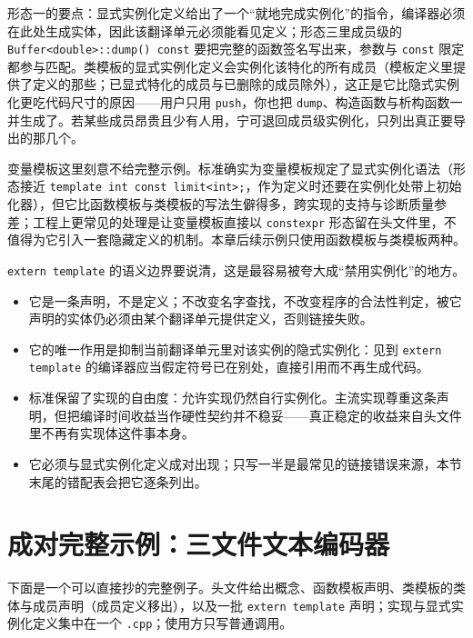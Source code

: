 \documentclass[12pt,a4paper,fontset=fandol]{ctexbook}
\newcommand{\kw}[1]{\texttt{#1}}
\begin{document}
形态一的要点：显式实例化定义给出了一个“就地完成实例化”的指令，编译器必须在此处生成实体，因此该翻译单元必须能看见定义；形态三里成员级的 \kw{Buffer<double>::dump() const} 要把完整的函数签名写出来，参数与 \kw{const} 限定都参与匹配。类模板的显式实例化定义会实例化该特化的所有成员（模板定义里提供了定义的那些；已显式特化的成员与已删除的成员除外），这正是它比隐式实例化更吃代码尺寸的原因——用户只用 \kw{push}，你也把 \kw{dump}、构造函数与析构函数一并生成了。若某些成员昂贵且少有人用，宁可退回成员级实例化，只列出真正要导出的那几个。

变量模板这里刻意不给完整示例。标准确实为变量模板规定了显式实例化语法（形态接近 \kw{template int const limit<int>;}，作为定义时还要在实例化处带上初始化器），但它比函数模板与类模板的写法生僻得多，跨实现的支持与诊断质量参差；工程上更常见的处理是让变量模板直接以 \kw{constexpr} 形态留在头文件里，不值得为它引入一套隐藏定义的机制。本章后续示例只使用函数模板与类模板两种。

\kw{extern template} 的语义边界要说清，这是最容易被夸大成“禁用实例化”的地方。

\begin{itemize}
  \item 它是一条声明，不是定义；不改变名字查找，不改变程序的合法性判定，被它声明的实体仍必须由某个翻译单元提供定义，否则链接失败。
  \item 它的唯一作用是抑制当前翻译单元里对该实例的隐式实例化：见到 \kw{extern template} 的编译器应当假定符号已在别处，直接引用而不再生成代码。
  \item 标准保留了实现的自由度：允许实现仍然自行实例化。主流实现尊重这条声明，但把编译时间收益当作硬性契约并不稳妥——真正稳定的收益来自头文件里不再有实现体这件事本身。
  \item 它必须与显式实例化定义成对出现；只写一半是最常见的链接错误来源，本节末尾的错配表会把它逐条列出。
\end{itemize}

\section{成对完整示例：三文件文本编码器}

下面是一个可以直接抄的完整例子。头文件给出概念、函数模板声明、类模板的类体与成员声明（成员定义移出），以及一批 \kw{extern template} 声明；实现与显式实例化定义集中在一个 \kw{.cpp}；使用方只写普通调用。
\end{document}
